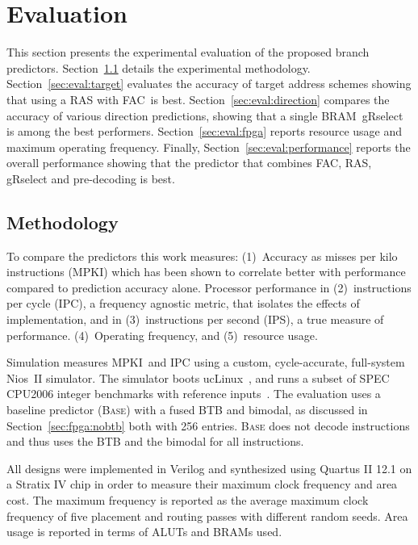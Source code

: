 \chapter{Evaluation}

This section presents the experimental evaluation of the proposed branch predictors.
Section~\ref{sec:eval:methodology} details the experimental methodology. Section~\ref{sec:eval:target} evaluates the accuracy of  target address schemes showing that using a RAS with FAC\  is best. Section~\ref{sec:eval:direction} compares the accuracy of various direction predictions, showing that a single BRAM\ gRselect is among the best performers. Section~\ref{sec:eval:fpga} reports  resource usage and maximum operating frequency. Finally,  Section~\ref{sec:eval:performance} reports the overall performance showing that the predictor that combines FAC, RAS, gRselect and pre-decoding is best. 


\section{Methodology}
\label{sec:eval:methodology}

To compare the predictors this work measures: (1)~Accuracy as misses per kilo instructions (MPKI) which has been shown to correlate better with performance compared to  prediction accuracy alone. Processor performance in (2)~instructions per cycle (IPC), a frequency agnostic metric, that isolates the effects of implementation, and  in (3)~instructions per second (IPS), a true measure of performance. (4)~Operating frequency, and (5)~resource usage.

Simulation measures MPKI\ and IPC using a custom, cycle-accurate, full-system Nios~II simulator. The simulator boots ucLinux~\cite{uclinux}, and runs a subset of SPEC CPU2006 integer benchmarks with reference inputs~\cite{spec2k6}.
The evaluation uses a baseline predictor (\textsc{Base}) with a fused BTB and bimodal, as discussed in Section~\ref{sec:fpga:nobtb} both with 256 entries. \textsc{Base} does not decode instructions and thus uses the BTB and the bimodal for all instructions. 

All designs were implemented in Verilog and synthesized using Quartus II 12.1 on a Stratix IV chip in order to measure their maximum clock frequency and area cost. The maximum frequency is reported as the average maximum clock frequency of five placement and routing passes with different random seeds. Area usage is reported in terms of ALUTs and BRAMs used.


